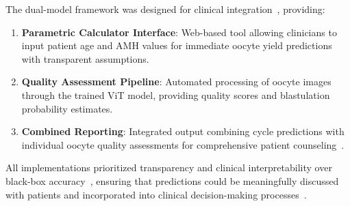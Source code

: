The dual-model framework was designed for clinical integration~\cite{fda2022clinical}, providing:

\begin{enumerate}
\item \textbf{Parametric Calculator Interface}: Web-based tool allowing clinicians to input patient age and AMH values for immediate oocyte yield predictions with transparent assumptions.

\item \textbf{Quality Assessment Pipeline}: Automated processing of oocyte images through the trained ViT model, providing quality scores and blastulation probability estimates.

\item \textbf{Combined Reporting}: Integrated output combining cycle predictions with individual oocyte quality assessments for comprehensive patient counseling~\cite{asrm2021counselors}.
\end{enumerate}

All implementations prioritized transparency and clinical interpretability over black-box accuracy~\cite{topol2019high}, ensuring that predictions could be meaningfully discussed with patients and incorporated into clinical decision-making processes~\cite{beauchamp2019principles}. 